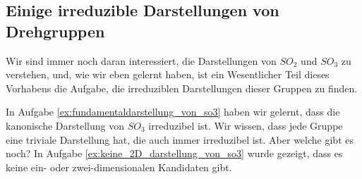 \subsection{Einige irreduzible Darstellungen von Drehgruppen}

\begin{remark}
Wir sind immer noch daran interessiert, die Darstellungen von $SO_2$ und $SO_3$ zu verstehen, und, wie wir eben gelernt haben, ist ein Wesentlicher Teil dieses Vorhabens die Aufgabe, die irreduziblen Darstellungen dieser Gruppen zu finden.

In Aufgabe \ref{ex:fundamentaldarstellung_von_so3} haben wir gelernt, dass die kanonische Darstellung von $SO_3$ irreduzibel ist. Wir wissen, dass jede Gruppe eine triviale Darstellung hat, die auch immer irreduzibel ist. Aber welche gibt es noch? In Aufgabe \ref{ex:keine_2D_darstellung_von_so3} wurde gezeigt, dass es keine ein- oder zwei-dimensionalen Kandidaten gibt.
\end{remark}